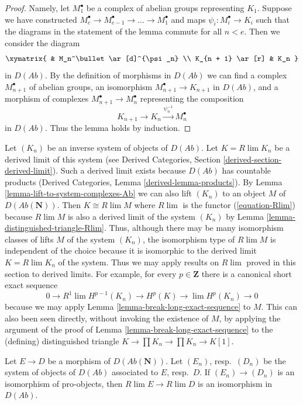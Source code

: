 \begin{proof}
Namely, let $M_1^\bullet$ be a complex of abelian groups representing $K_1$.
Suppose we have constructed
$M_e^\bullet \to M_{e - 1}^\bullet \to \ldots \to M_1^\bullet$
and maps $\psi_i : M_i^\bullet \to K_i$ such that
the diagrams in the statement of the lemma commute for all $n < e$.
Then we consider the diagram
$$
\xymatrix{
& M_n^\bullet \ar[d]^{\psi_n} \\
K_{n + 1} \ar[r] & K_n
}
$$
in $D(\textit{Ab})$. By the definition of morphisms in $D(\textit{Ab})$
we can find a complex $M_{n + 1}^\bullet$ of abelian groups, an isomorphism
$M_{n + 1}^\bullet \to K_{n + 1}$ in $D(\textit{Ab})$, and a
morphism of complexes $M_{n + 1}^\bullet \to M_n^\bullet$
representing the composition
$$
K_{n + 1} \to K_n \xrightarrow{\psi_n^{-1}} M_n^\bullet
$$
in $D(\textit{Ab})$.
Thus the lemma holds by induction.
\end{proof}

\begin{remark}
\label{remark-compare-derived-limit}
Let $(K_n)$ be an inverse system of objects of $D(\textit{Ab})$.
Let $K = R\lim K_n$ be a derived limit of this system (see
Derived Categories, Section \ref{derived-section-derived-limit}). Such
a derived limit exists because $D(\textit{Ab})$ has countable products
(Derived Categories, Lemma \ref{derived-lemma-products}).
By Lemma \ref{lemma-lift-to-system-complexes-Ab} we can also lift
$(K_n)$ to an object $M$ of $D(\textit{Ab}(\mathbf{N}))$.
Then $K \cong R\lim M$ where $R\lim$ is the functor (\ref{equation-Rlim})
because $R\lim M$ is also a derived limit of the system $(K_n)$
by Lemma \ref{lemma-distinguished-triangle-Rlim}.
Thus, although there may be many isomorphism classes of lifts $M$
of the system $(K_n)$, the isomorphism type of
$R\lim M$ is independent of the choice because it is isomorphic
to the derived limit $K = R\lim K_n$ of the system. Thus we may
apply results on $R\lim$ proved in this section to derived limits.
For example, for every $p \in \mathbf{Z}$ there is a
canonical short exact sequence
$$
0 \to R^1\lim H^{p - 1}(K_n) \to H^p(K) \to \lim H^p(K_n) \to 0
$$
because we may apply Lemma \ref{lemma-break-long-exact-sequence} to $M$.
This can also been seen directly, without invoking the existence of $M$,
by applying the argument of the proof of
Lemma \ref{lemma-break-long-exact-sequence} to the (defining)
distinguished triangle $K \to \prod K_n \to \prod K_n \to K[1]$.
\end{remark}

\begin{lemma}
\label{lemma-Rlim-pro-equal}
Let $E \to D$ be a morphism of $D(\textit{Ab}(\mathbf{N}))$.
Let $(E_n)$, resp.\ $(D_n)$ be the system of objects of
$D(\textit{Ab})$ associated to $E$, resp.\ $D$.
If $(E_n) \to (D_n)$ is an isomorphism of pro-objects, then
$R\lim E \to R\lim D$ is an isomorphism in $D(\textit{Ab})$.
\end{lemma}

